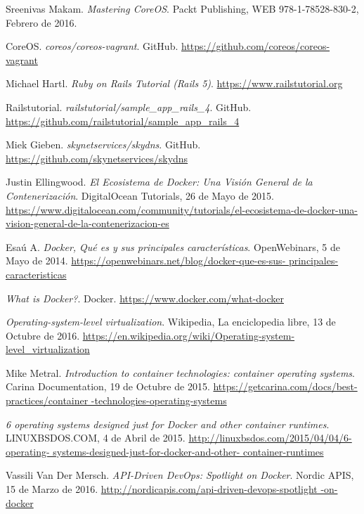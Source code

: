 \begin{thebibliography}{9}
Sreenivas Makam.
\textit{Mastering CoreOS}. 
Packt Publishing, WEB 978-1-78528-830-2, Febrero de 2016.

CoreOS.
\textit{coreos/coreos-vagrant}. GitHub.
\url{https://github.com/coreos/coreos-vagrant}

Michael Hartl.
\textit{Ruby on Rails Tutorial (Rails 5)}. 
\url{https://www.railstutorial.org}

Railstutorial.
\textit{railstutorial/sample\_app\_rails\_4}. GitHub.
\url{https://github.com/railstutorial/sample\_app\_rails\_4}

Miek Gieben.
\textit{skynetservices/skydns}. GitHub.
\url{https://github.com/skynetservices/skydns}
 
Justin Ellingwood.
\textit{El Ecosistema de Docker: Una Visión General de la Contenerización}. 
DigitalOcean Tutorials, 26 de Mayo de 2015.
\url{https://www.digitalocean.com/community/tutorials/el-ecosistema-de-docker-una-vision-general-de-la-contenerizacion-es}

Esaú A.
\textit{Docker, Qué es y sus principales características}. 
OpenWebinars, 5 de Mayo de 2014.
\url{https://openwebinars.net/blog/docker-que-es-sus-
principales-caracteristicas}

\textit{What is Docker?}. 
Docker.
\url{https://www.docker.com/what-docker}

\textit{Operating-system-level virtualization}. 
Wikipedia, La enciclopedia libre, 13 de Octubre de 2016.
\url{https://en.wikipedia.org/wiki/Operating-system-
level\_virtualization}

Mike Metral.
\textit{Introduction to container technologies: container operating systems}. 
Carina Documentation, 19 de Octubre de 2015.
\url{https://getcarina.com/docs/best-practices/container
-technologies-operating-systems}

\textit{6 operating systems designed just for Docker and other container runtimes}. 
LINUXBSDOS.COM, 4 de Abril de 2015.
\url{http://linuxbsdos.com/2015/04/04/6-operating-
systems-designed-just-for-docker-and-other-
container-runtimes}

Vassili Van Der Mersch.
\textit{API-Driven DevOps: Spotlight on Docker}. 
Nordic APIS, 15 de Marzo de 2016.
\url{http://nordicapis.com/api-driven-devops-spotlight
-on-docker}


\end{thebibliography}
